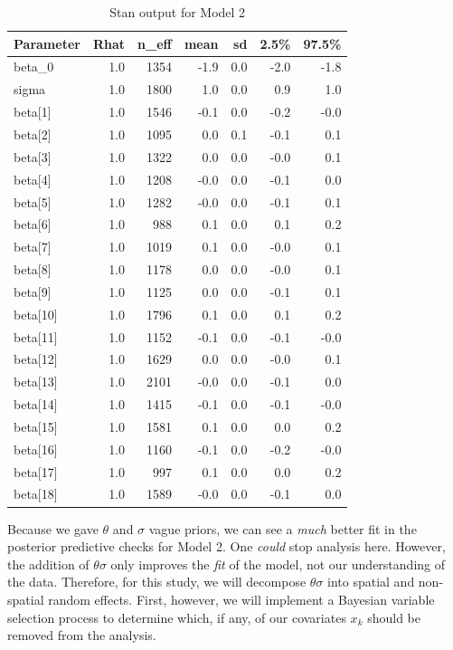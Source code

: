 \documentclass[]{article}
\begin{document}
\begin{table}[H]
\centering
\begin{tabular}{lrrrrrr}
  \toprule
Parameter & Rhat & n\_eff & mean & sd & 2.5\% & 97.5\% \\ 
  \midrule
beta\_0 & 1.0 & 1354 & -1.9 & 0.0 & -2.0 & -1.8 \\ 
  sigma & 1.0 & 1800 & 1.0 & 0.0 & 0.9 & 1.0 \\ 
  beta[1] & 1.0 & 1546 & -0.1 & 0.0 & -0.2 & -0.0 \\ 
  beta[2] & 1.0 & 1095 & 0.0 & 0.1 & -0.1 & 0.1 \\ 
  beta[3] & 1.0 & 1322 & 0.0 & 0.0 & -0.0 & 0.1 \\ 
  beta[4] & 1.0 & 1208 & -0.0 & 0.0 & -0.1 & 0.0 \\ 
  beta[5] & 1.0 & 1282 & -0.0 & 0.0 & -0.1 & 0.1 \\ 
  beta[6] & 1.0 & 988 & 0.1 & 0.0 & 0.1 & 0.2 \\ 
  beta[7] & 1.0 & 1019 & 0.1 & 0.0 & -0.0 & 0.1 \\ 
  beta[8] & 1.0 & 1178 & 0.0 & 0.0 & -0.0 & 0.1 \\ 
  beta[9] & 1.0 & 1125 & 0.0 & 0.0 & -0.1 & 0.1 \\ 
  beta[10] & 1.0 & 1796 & 0.1 & 0.0 & 0.1 & 0.2 \\ 
  beta[11] & 1.0 & 1152 & -0.1 & 0.0 & -0.1 & -0.0 \\ 
  beta[12] & 1.0 & 1629 & 0.0 & 0.0 & -0.0 & 0.1 \\ 
  beta[13] & 1.0 & 2101 & -0.0 & 0.0 & -0.1 & 0.0 \\ 
  beta[14] & 1.0 & 1415 & -0.1 & 0.0 & -0.1 & -0.0 \\ 
  beta[15] & 1.0 & 1581 & 0.1 & 0.0 & 0.0 & 0.2 \\ 
  beta[16] & 1.0 & 1160 & -0.1 & 0.0 & -0.2 & -0.0 \\ 
  beta[17] & 1.0 & 997 & 0.1 & 0.0 & 0.0 & 0.2 \\ 
  beta[18] & 1.0 & 1589 & -0.0 & 0.0 & -0.1 & 0.0 \\ 
   \bottomrule
\end{tabular}
\caption{Stan output for Model 2} 
\end{table}

Because we gave \(\theta\) and \(\sigma\) vague priors, we can see a
\emph{much} better fit in the posterior predictive checks for Model 2.
One \emph{could} stop analysis here. However, the addition of
\(\theta \sigma\) only improves the \emph{fit} of the model, not our
understanding of the data. Therefore, for this study, we will decompose
\(\theta \sigma\) into spatial and non-spatial random effects. First,
however, we will implement a Bayesian variable selection process to
determine which, if any, of our covariates \(x_k\) should be removed
from the analysis.
\end{document}
